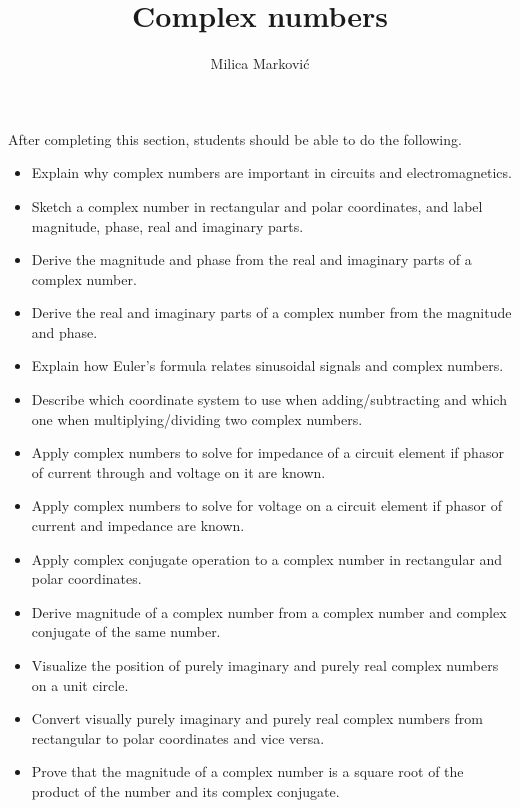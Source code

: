 \documentclass{ximera}
\title{Complex numbers}
\author{Milica Markovi{\'c}}
\begin{document}
\begin{abstract}
\end{abstract}

\maketitle

\begin{sectionOutcomes}

After completing this section, students should be able to do the following.

\begin{itemize}
\item Explain why complex numbers are important in circuits and electromagnetics.
\item Sketch a complex number in rectangular and polar coordinates, and label magnitude, phase, real and imaginary parts.
\item Derive the magnitude and phase from the real and imaginary parts of a complex number.
\item Derive the real and imaginary parts of a complex number from the magnitude and phase.
\item Explain how Euler's formula relates sinusoidal signals and complex numbers.
\item Describe which coordinate system to use when adding/subtracting and which one when multiplying/dividing two complex numbers.
\item Apply complex numbers to solve for impedance of a circuit element if phasor of current through and voltage on it are known.
\item Apply complex numbers to solve for voltage on a circuit element if phasor of current and impedance are known.
\item Apply complex conjugate operation to a complex number in rectangular and polar coordinates.
\item Derive magnitude of a complex number from a complex number and complex conjugate of the same number.
\item Visualize the position of  purely imaginary and purely real complex numbers on a unit circle.
\item Convert visually purely imaginary and purely real complex numbers from rectangular to polar coordinates and vice versa.
\item Prove that the magnitude of a complex number is a square root of the product of the number and its complex conjugate.
\end{itemize}

\end{sectionOutcomes}
\end{document}

